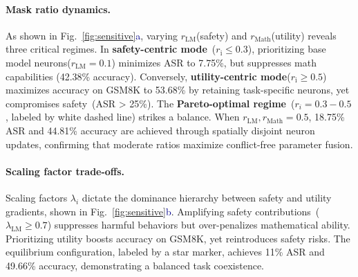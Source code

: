 \paragraph{Mask ratio dynamics.}
As shown in Fig.~\ref{fig:sensitive}\textcolor{darkblue}{a}, varying \(r_{\text{LM}}\)(safety) and \(r_{\text{Math}}\)(utility) reveals three critical regimes. In \textbf{safety-centric mode}~($r_{\text{i}}\leq 0.3$), prioritizing base model neurons($r_{\text{LM}}=0.1$) minimizes ASR to 7.75\%, but suppresses math capabilities (42.38\% accuracy). Conversely, \textbf{utility-centric mode}($r_{\text{i}}\geq 0.5$) maximizes accuracy on GSM8K to 53.68\% by retaining task-specific neurons, yet compromises safety~(ASR > 25\%). The \textbf{Pareto-optimal regime}~($r_{i}=0.3-0.5$, labeled by white dashed line) strikes a balance. When $r_{\text{LM}}, r_{\text{Math}}=0.5$, 18.75\% ASR and 44.81\% accuracy are achieved through spatially disjoint neuron updates, confirming that moderate ratios maximize conflict-free parameter fusion.

\paragraph{Scaling factor trade-offs.}
Scaling factors \(\lambda_i\) dictate the dominance hierarchy between safety and utility gradients, shown in Fig.~\ref{fig:sensitive}\textcolor{darkblue}{b}. Amplifying safety contributions~($\lambda_{\text{LM}} \geq 0.7$) suppresses harmful behaviors but over-penalizes mathematical ability. 
Prioritizing utility boosts accuracy on GSM8K, yet reintroduces safety risks. The equilibrium configuration, labeled by a star marker, achieves 11\% ASR and 49.66\% accuracy, demonstrating a balanced task coexistence.




